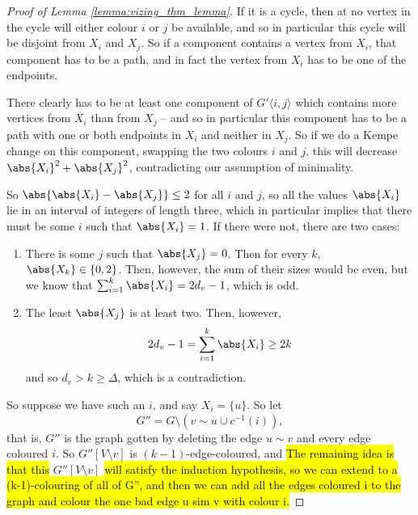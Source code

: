 \documentclass[nobib]{tufte-handout}
\begin{document}
\begin{proof}[Proof of Lemma \ref{lemma:vizing_thm_lemma}]
  If it is a cycle, then at no vertex in the cycle will either colour $i$ or $j$ be available, and so in particular this cycle will be disjoint from $X_i$ and $X_j$. So if a component contains a vertex from $X_i$, that component has to be a path, and in fact the vertex from $X_i$ has to be one of the endpoints.

  There clearly has to be at least one component of $G'\langle i, j\rangle$ which contains more vertices from $X_i$ than from $X_j$ -- and so in particular this component has to be a path with one or both endpoints in $X_i$ and neither in $X_j$. So if we do a Kempe change on this component, swapping the two colours $i$ and $j$, this will decrease $\abs{X_i}^2 + \abs{X_j}^2$, contradicting our assumption of minimality.

  So $\abs{\abs{X_i} - \abs{X_j}} \leq 2$ for all $i$ and $j$, so all the values $\abs{X_i}$ lie in an interval of integers of length three, which in particular implies that there must be some $i$ such that $\abs{X_i} = 1$. If there were not, there are two cases:
  \begin{enumerate}
    \item There is some $j$ such that $\abs{X_j} = 0$. Then for every $k$, $\abs{X_k} \in \{0, 2\}$. Then, however, the sum of their sizes would be even, but we know that $\sum_{i=1}^{k} \abs{X_i} = 2d_v - 1$, which is odd.
    \item The least $\abs{X_j}$ is at least two. Then, however,
    $$2d_v - 1 = \sum_{i=1}^{k} \abs{X_i} \geq 2k$$
    and so $d_v > k \geq \Delta$, which is a contradiction.
  \end{enumerate}

  So suppose we have such an $i$, and say $X_i = \{u\}$. So let 
  $$G'' = G \setminus (v \sim u \cup c^{-1}(i)),$$
  that is, $G''$ is the graph gotten by deleting the edge $u \sim v$ and every edge coloured $i$. So $G''[V\setminus v]$ is $(k-1)$-edge-coloured, and \hl{The remaining idea is that this }$G''[V\setminus v]$\hl{ will satisfy the induction hypothesis, so we can extend to a (k-1)-colouring of all of G'', and then we can add all the edges coloured i to the graph and colour the one bad edge u sim v with colour i.}



\end{proof}
\end{document}
